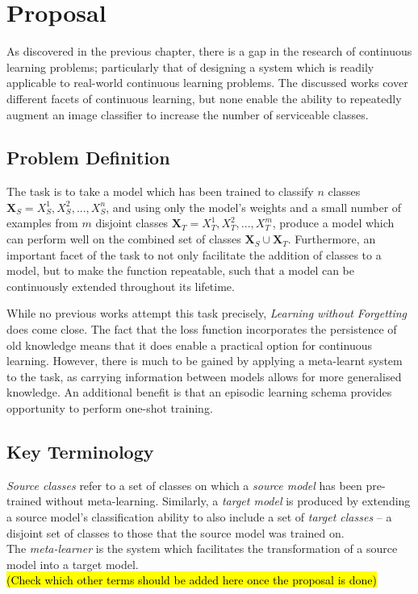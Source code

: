 \documentclass{report}
\newcommand{\TODO}[1]{\sethlcolor{pink}\hl{\\(#1)\\}}
\begin{document}
	\chapter{Proposal} \label{proposal}
	As discovered in the previous chapter, there is a gap in the research of continuous learning problems; particularly that of designing a system which is readily applicable to real-world continuous learning problems. The discussed works cover different facets of continuous learning, but none enable the ability to repeatedly augment an image classifier to increase the number of serviceable classes. \par
	
	\section{Problem Definition}
	The task is to take a model which has been trained to classify $n$ classes $\bm{X}_S = {X_S^1, X_S^2, ..., X_S^n}$, and using only the model's weights and a small number of examples from $m$ disjoint classes $\bm{X}_T = {X_T^1, X_T^2, ..., X_T^m}$, produce a model which can perform well on the combined set of classes $\bm{X}_S \cup \bm{X}_T$.
	Furthermore, an important facet of the task to not only facilitate the addition of classes to a model, but to make the function repeatable, such that a model can be continuously extended throughout its lifetime. \par
	While no previous works attempt this task precisely, \textit{Learning without Forgetting} does come close. The fact that the loss function incorporates the persistence of old knowledge means that it does enable a practical option for continuous learning. However, there is much to be gained by applying a meta-learnt system to the task, as carrying information between models allows for more generalised knowledge. An additional benefit is that an episodic learning schema provides opportunity to perform one-shot training. \par
	
	\section{Key Terminology}
	\textit{Source classes} refer to a set of classes on which a \textit{source model} has been pre-trained without meta-learning. Similarly, a \textit{target model} is produced by extending a source model's classification ability to also include a set of \textit{target classes} -- a disjoint set of classes to those that the source model was trained on. \\
	The \textit{meta-learner} is the system which facilitates the transformation of a source model into a target model. 
	\TODO{Check which other terms should be added here once the proposal is done}
	
\end{document}
